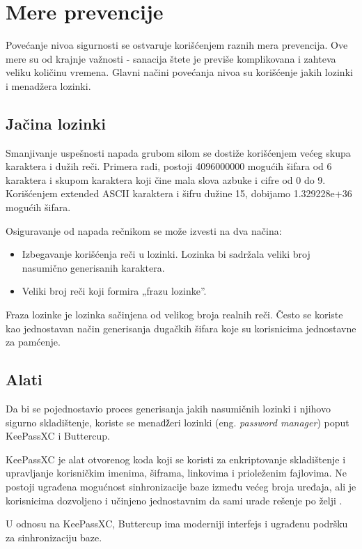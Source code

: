 \documentclass[fleqn, 12pt]{article}
\begin{document}
\section{Mere prevencije}
Povećanje nivoa sigurnosti se ostvaruje korišćenjem raznih mera prevencija. Ove mere su od krajnje važnosti - sanacija štete je previše komplikovana i zahteva veliku količinu vremena. Glavni načini povećanja nivoa su korišćenje jakih lozinki i menadžera lozinki.
\subsection{Jačina lozinki}
\indent Smanjivanje uspešnosti napada grubom silom se dostiže korišćenjem većeg skupa karaktera i dužih reči. Primera radi, postoji 4096000000 mogućih šifara od 6 karaktera i skupom karaktera koji čine mala slova azbuke i cifre od 0 do 9. Korišćenjem extended ASCII karaktera i šifru dužine 15, dobijamo 1.329228e+36 mogućih šifara. 

Osiguravanje od napada rečnikom se može izvesti na dva načina:
\begin{itemize}
    \item Izbegavanje korišćenja reči u lozinki. Lozinka bi sadržala veliki broj nasumično generisanih karaktera.
    \item Veliki broj reči koji formira „frazu lozinke''.
\end{itemize}

Fraza lozinke je lozinka sačinjena od velikog broja realnih reči. Često se koriste kao jednostavan način generisanja dugačkih šifara koje su korisnicima jednostavne za pamćenje. 

\subsection{Alati}
\indent Da bi se pojednostavio proces generisanja jakih nasumičnih lozinki i njihovo sigurno skladištenje, koriste se menaǆeri lozinki (eng. \emph{password manager}) poput KeePassXC i Buttercup. 

KeePassXC je alat otvorenog koda koji se koristi za enkriptovanje skladištenje i upravljanje korisničkim imenima, šiframa, linkovima i prioleženim fajlovima. Ne postoji ugrađena mogućnost sinhronizacije baze između većeg broja uređaja, ali je korisnicima dozvoljeno i učinjeno jednostavnim da sami urade rešenje po želji \cite{keepassxc}.

U odnosu na KeePassXC, Buttercup ima moderniji interfejs i ugrađenu podršku za sinhronizaciju baze\cite{buttercup}. 
\end{document}
